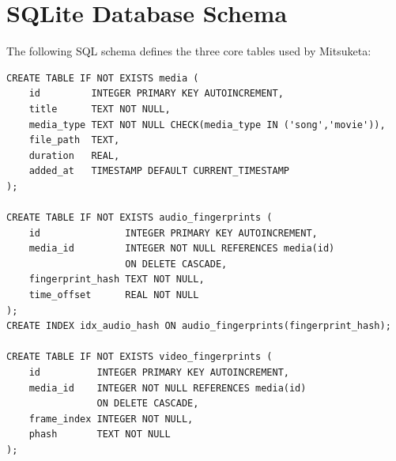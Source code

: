 \newpage
\chapter{SQLite Database Schema}

The following SQL schema defines the three core tables used by Mitsuketa:

\begin{verbatim}
CREATE TABLE IF NOT EXISTS media (
    id         INTEGER PRIMARY KEY AUTOINCREMENT,
    title      TEXT NOT NULL,
    media_type TEXT NOT NULL CHECK(media_type IN ('song','movie')),
    file_path  TEXT,
    duration   REAL,
    added_at   TIMESTAMP DEFAULT CURRENT_TIMESTAMP
);

CREATE TABLE IF NOT EXISTS audio_fingerprints (
    id               INTEGER PRIMARY KEY AUTOINCREMENT,
    media_id         INTEGER NOT NULL REFERENCES media(id)
                     ON DELETE CASCADE,
    fingerprint_hash TEXT NOT NULL,
    time_offset      REAL NOT NULL
);
CREATE INDEX idx_audio_hash ON audio_fingerprints(fingerprint_hash);

CREATE TABLE IF NOT EXISTS video_fingerprints (
    id          INTEGER PRIMARY KEY AUTOINCREMENT,
    media_id    INTEGER NOT NULL REFERENCES media(id)
                ON DELETE CASCADE,
    frame_index INTEGER NOT NULL,
    phash       TEXT NOT NULL
);
\end{verbatim}
